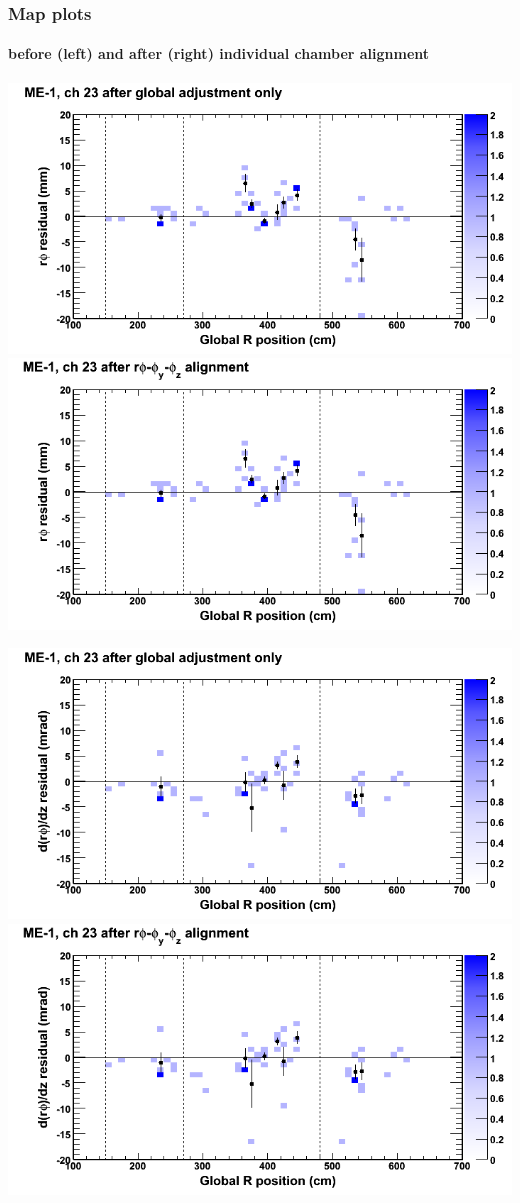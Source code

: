 \documentclass[compress]{beamer}
\begin{document}
\begin{frame}
\frametitle{Map plots}
\framesubtitle{before (left) and after (right) individual chamber alignment}
\includegraphics[width=0.5\linewidth]{ringmapplots_3dof/before_CSCvsr_mem1ch23_x.png} \includegraphics[width=0.5\linewidth]{ringmapplots_3dof/after_CSCvsr_mem1ch23_x.png}

\includegraphics[width=0.5\linewidth]{ringmapplots_3dof/before_CSCvsr_mem1ch23_dxdz.png} \includegraphics[width=0.5\linewidth]{ringmapplots_3dof/after_CSCvsr_mem1ch23_dxdz.png}
\end{frame}
\end{document}
